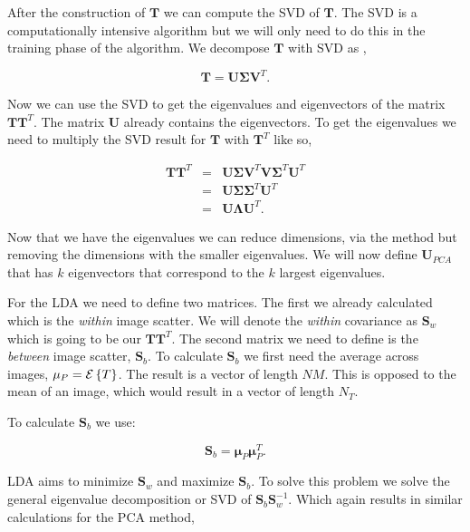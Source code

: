 After the construction of $\mathbf{T}$ we can compute the \ac{SVD} of $\mathbf{T}$. The \ac{SVD} is a computationally intensive algorithm but we will only need to do this in the training phase of the algorithm. We decompose $\mathbf{T}$ with \ac{SVD} as \cite{Str09},

\begin{equation}
\mathbf{T}=\mathbf{U}\mathbf{\Sigma}\mathbf{V}^T.
\end{equation}

Now we can use the \ac{SVD} to get the eigenvalues and eigenvectors of the matrix $\mathbf{T}\mathbf{T}^T$. The matrix $\mathbf{U}$ already contains the eigenvectors. To get the eigenvalues we need to multiply the \ac{SVD} result for $\mathbf{T}$ with $\mathbf{T}^T$ like so,

\begin{eqnarray}
\mathbf{T}\mathbf{T}^T&=&\mathbf{U}\mathbf{\Sigma}\mathbf{V}^T\mathbf{V}\mathbf{\Sigma}^T\mathbf{U}^T\\
&=&\mathbf{U}\mathbf{\Sigma}\mathbf{\Sigma}^T\mathbf{U}^T\\
&=&\mathbf{U}\mathbf{\Lambda}\mathbf{U}^T.
\end{eqnarray}	

Now that we have the eigenvalues we can reduce dimensions, via the  method but removing the dimensions with the smaller eigenvalues. We will now define $\mathbf{U}_{PCA}$ that has $k$ eigenvectors that correspond to the $k$ largest eigenvalues. 

For the \ac{LDA} we need to define two matrices. The first we already calculated which is the \emph{within} image scatter. We will denote the \emph{within} covariance as $\mathbf{S}_w$ which is going to be our $\mathbf{T}\mathbf{T}^T$. The second matrix we need to define is the \emph{between} image scatter, $\mathbf{S}_b$. To calculate $\mathbf{S}_b$ we first need the average across images, $\mathbf{\mu}_P = {\mathcal{E}}\left\{T\right\}$. The result is a vector of length $NM$. This is opposed to the mean of an image, which would result in a vector of length $N_T$.

To calculate $\mathbf{S}_b$ we use:

\begin{equation}
\mathbf{S}_b = \mathbf{\mu}_P\mathbf{\mu}^T_P.
\end{equation}

\ac{LDA} aims to minimize $\mathbf{S}_w$ and maximize $\mathbf{S}_b$. To solve this problem we solve the general eigenvalue decomposition or \ac{SVD} of $\mathbf{S}_b\mathbf{S}_w^{-1}$. Which again results in similar calculations for the \ac{PCA} method,

